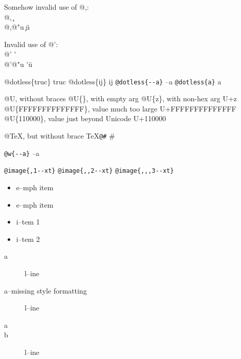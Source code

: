 \documentclass{book}
\begin{document}
\begin{titlepage}
Somehow invalid use of @,:\leavevmode{}\\
@, \c{}
\leavevmode{}\\
@,@"u \c{}\"{u}

Invalid use of @':\leavevmode{}\\
@' \'{}
\leavevmode{}\\
@'@"u \'{}\"{u}

@dotless\{truc\} truc
@dotless\{ij\} ij
\texttt{@dotless\{{-}{-}a\}} --a
\texttt{@dotless\{a\}} a

@U, without braces @U\{\}, with empty arg 
@U\{z\}, with non-hex arg U+z
@U\{FFFFFFFFFFFFFF\}, value much too large U+FFFFFFFFFFFFFF
@U\{110000\}, value just beyond Unicode U+110000

@TeX, but without brace \TeX{}\texttt{@\#} \#

\texttt{@w\{{-}{-}a\}} \hbox{--a}

\texttt{@image\{,1{-}{-}xt\}} 
\texttt{@image\{,,2{-}{-}xt\}} 
\texttt{@image\{,,,3{-}{-}xt\}} 


\begin{itemize}[label=\emph{}]
\item e--mph item
\end{itemize}

\begin{itemize}[label=\emph{} after emph]
\item e--mph item
\end{itemize}

\begin{itemize}[label=\textbullet{} a--n itemize line]
\item i--tem 1
\item i--tem 2
\end{itemize}

\begin{description}
\item[a]
l--ine
\end{description}

\begin{description}
\item[a--missing style formatting]
l--ine
\end{description}

\begin{description}
\item[a]
%
%
\item[b]
%
l--ine
\end{description}


\end{titlepage}
\end{document}
